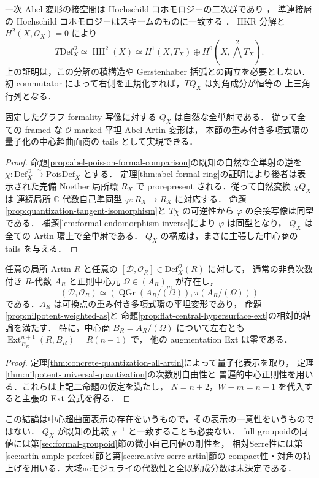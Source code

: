 \begin{remark}
一次 Abel 変形の接空間は Hochschild コホモロジーの二次群であり
\cite[Theorem~3.1]{LowenVdBHochschild}，
準連接層の Hochschild コホモロジーはスキームのものに一致する
\cite[Corollaries~7.7.2,7.8.2]{LowenVdBHochschild}．
HKR 分解\cite[Corollary~0.6]{YekutieliHKR2002}と $H^2(X,\mathcal O_X)=0$ により
\[
 T\mathrm{Def}^{\mathcal O}_X
 \simeq\operatorname{HH}^2(X)
 \simeq H^1(X,T_X)\oplus H^0(X,\bigwedge^2T_X).
\]
上の証明は，この分解の積構造や Gerstenhaber 括弧との両立を必要としない．
初 commutator によって右側を正規化すれば，$TQ_X$ は対角成分が恒等の
上三角行列となる．
\end{remark}

\begin{theorem}
\label{thm:concrete-quantization-all-artin}
固定したグラフ formality 写像に対する $Q_X$ は自然な全単射である．
従って全ての framed な $\mathcal O$-marked 平坦 Abel Artin 変形は，
本節の重み付き多項式環の量子化の中心超曲面商の tails として実現できる．
\end{theorem}
\begin{proof}
命題\ref{prop:abel-poisson-formal-comparison}の既知の自然な全単射の逆を
$\chi:\mathrm{Def}^{\mathcal O}_X\xrightarrow{\sim}\mathrm{PoisDef}_X$ とする．
定理\ref{thm:abel-formal-ring}の証明により後者は表示された完備 Noether 局所環
$R_X$ で prorepresent される．従って自然変換 $\chi Q_X$ は
連続局所 $\mathbb C$-代数自己準同型 $\varphi:R_X\to R_X$ に対応する．
命題\ref{prop:quantization-tangent-isomorphism}と $T\chi$ の可逆性から
$\varphi$ の余接写像は同型である．
補題\ref{lem:formal-endomorphism-inverse}により $\varphi$ は同型となり，
$Q_X$ は全ての Artin 環上で全単射である．
$Q_X$ の構成は，まさに主張した中心商の tails を与える．
\end{proof}

\begin{corollary}[通常の次数付き中心超曲面表示]
\label{cor:all-artin-weighted-hypersurface-presentation}
任意の局所 Artin $R$ と任意の
$[\mathcal D,\mathcal O_R]\in\mathrm{Def}^{\mathcal O}_X(R)$ に対して，
通常の非負次数付き $R$-代数 $A_R$ と正則中心元 $\Omega\in(A_R)_m$ が存在し，
\[
 (\mathcal D,\mathcal O_R)
 \simeq(\operatorname{QGr}(A_R/(\Omega)),\pi(A_R/(\Omega)))
\]
である．$A_R$ は可換点の重み付き多項式環の平坦変形であり，
命題\ref{prop:nilpotent-weighted-as}と
命題\ref{prop:flat-central-hypersurface-ext}の相対的結論を満たす．
特に，中心商 $B_R=A_R/(\Omega)$ について左右とも
$\underline{\operatorname{Ext}}_{B_R}^{n+1}(R,B_R)=R(n-1)$ で，
他の augmentation Ext は零である．
\end{corollary}
\begin{proof}
定理\ref{thm:concrete-quantization-all-artin}によって量子化表示を取り，
定理\ref{thm:nilpotent-universal-quantization}の次数別自由性と
普遍的中心正則性を用いる．これらは上記二命題の仮定を満たし，
$N=n+2$，$W-m=n-1$ を代入すると主張の Ext 公式を得る．
\end{proof}

この結論は中心超曲面表示の存在をいうもので，その表示の一意性をいうものではない．
$Q_X$ が既知の比較 $\chi^{-1}$ と一致することも必要ない．
full groupoidの同値には第\ref{sec:formal-groupoid}節の微小自己同値の剛性を，
相対Serre性には第\ref{sec:artin-ample-perfect}節と第\ref{sec:relative-serre-artin}節の
compact性・対角の持上げを用いる．大域ncモジュライの代数性と全既約成分数は未決定である．
